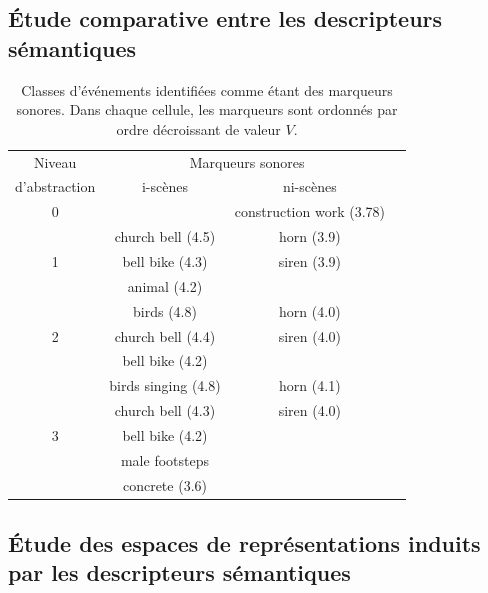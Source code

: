 \subsection{Étude comparative entre les descripteurs sémantiques}

\begin{table}[t]
 \setlength{\tabcolsep}{0.2pt}
 \centering
  {\renewcommand{\arraystretch}{0.9}
\begin{tabular}{c c c c} 
Niveau        & \multicolumn{2}{c}{Marqueurs sonores} \\
d'abstraction & i-scènes & ni-scènes \\
\hline
0  &                               &  construction work (3.78)  \\
\hline
  & church bell  (4.5)             & horn  (3.9) \\
1 & bell bike    (4.3)             & siren (3.9)\\
  & animal       (4.2)             &       \\
   \hline
  & birds        (4.8)             & horn  (4.0)\\
2 & church bell  (4.4)             & siren (4.0)\\
  & bell bike    (4.2)             &       \\
   \hline
  & birds singing (4.8)            & horn  (4.1)\\
  & church bell   (4.3)            & siren (4.0)\\
3 & bell bike     (4.2)            &       \\
  & male footsteps                 &  \\
  &   concrete (3.6)               &  \\
  \hline
\end{tabular}
}
\vspace{0.5mm}
\caption[Classes d'événements identifiées comme étant des marqueurs sonores]{Classes d'événements identifiées comme étant des marqueurs sonores. Dans chaque cellule, les marqueurs sont ordonnés par ordre décroissant de valeur $V$.}
\label{tab:markers}
\end{table}

\subsection{Étude des espaces de représentations induits par les descripteurs sémantiques}

